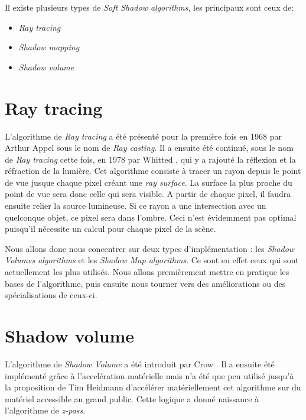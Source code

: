 \documentclass[a4paper,10pt]{report}
\begin{document}
Il existe plusieurs types de \textit{Soft Shadow algorithms}, les principaux sont ceux de:
\begin{itemize}
\item{\textit{Ray tracing}}
\item{\textit{Shadow mapping}}
\item{\textit{Shadow volume}}
\end{itemize}

\pagebreak

\section{Ray tracing}


L'algorithme de \textit{Ray tracing} a été présenté pour la première fois en 1968 par Arthur Appel\cite{appel1968some} sous le nom de \textit{Ray casting}. Il a ensuite été continué, sous le nom de \textit{Ray tracing} cette fois, en 1978 par Whitted \cite{whitted1978scan}, qui y a rajouté la réflexion et la réfraction de la lumière. 
Cet algorithme consiste à tracer un rayon depuis le point de vue jusque chaque pixel créant une \textit{ray surface}. La surface la plus proche du point de vue sera donc celle qui sera visible. A partir de chaque pixel, il faudra ensuite relier la source lumineuse. Si ce rayon a une intersection avec un quelconque objet, ce pixel sera dans l'ombre. Ceci n'est évidemment pas optimal puisqu'il nécessite un calcul pour chaque pixel de la scène.

Nous allons donc nous concentrer sur deux types d'implémentation : les \textit{Shadow Volumes algorithms} et les \textit{Shadow Map algorithms}. Ce sont en effet ceux qui sont actuellement les plus utilisés. Nous allons premièrement mettre en pratique les bases de l'algorithme, puis ensuite nous tourner vers des améliorations ou des spécialisations de ceux-ci.


\section{Shadow volume}


L'algorithme de \textit{Shadow Volume} a été introduit par Crow \cite{crow1977shadow}. Il a ensuite été implémenté grâce à l'accelération matérielle\cite{fuchs1986fast} mais n'a été que peu utilisé jusqu'à la proposition de Tim Heidmann d'accélérer matériellement cet algorithme sur du matériel accessible au grand public. Cette logique a donné naissance à l'algorithme de \textit{z-pass}\cite{heidmann1991real}. 
\\
\end{document}
